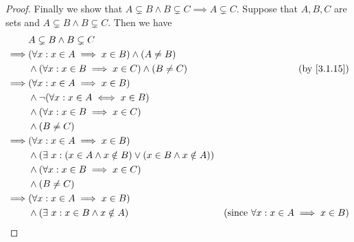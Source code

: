 \begin{proof}
  Finally we show that \(A \subsetneq B \land B \subsetneq C \implies A \subsetneq C\).
  Suppose that \(A, B, C\) are sets and \(A \subsetneq B \land B \subsetneq C\).
  Then we have
  \begin{align*}
             & A \subsetneq B \land B \subsetneq C                                                                                                       \\
    \implies & (\forall x : x \in A \implies x \in B) \land (A \neq B)                                                                                   \\
             & \land (\forall x : x \in B \implies x \in C) \land (B \neq C)                   & \text{(by \cref{3.1.15})}                               \\
    \implies & (\forall x : x \in A \implies x \in B)                                                                                                    \\
             & \land \lnot(\forall x : x \in A \iff x \in B)                                                                                             \\
             & \land (\forall x : x \in B \implies x \in C)                                                                                              \\
             & \land (B \neq C)                                                                                                                          \\
    \implies & (\forall x : x \in A \implies x \in B)                                                                                                    \\
             & \land (\exists\ x : (x \in A \land x \notin B) \lor (x \in B \land x \notin A))                                                           \\
             & \land (\forall x : x \in B \implies x \in C)                                                                                              \\
             & \land (B \neq C)                                                                                                                          \\
    \implies & (\forall x : x \in A \implies x \in B)                                                                                                    \\
             & \land (\exists\ x : x \in B \land x \notin A)                                   & \text{(since \(\forall x : x \in A \implies x \in B\))} \\

\end{align*}
\end{proof}
